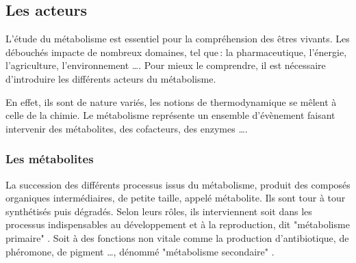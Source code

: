 \begin{refsection}
    \subsection{Les acteurs}
    
    L'étude du métabolisme est essentiel pour la compréhension des êtres vivants. Les débouchés impacte de nombreux domaines, tel que : la pharmaceutique, l'énergie, l'agriculture, l'environnement \ldots. Pour mieux le comprendre, il est nécessaire d'introduire les différents acteurs du métabolisme.
    
    En effet, ils sont de nature variés, les notions de thermodynamique se mêlent à celle de la chimie. Le métabolisme représente un ensemble d'évènement faisant intervenir des métabolites, des cofacteurs, des enzymes \ldots.
    
    
    \subsubsection{Les métabolites}
    
    La succession des différents processus issus du métabolisme, produit des composés organiques intermédiaires, de petite taille, appelé métabolite. Ils sont tour à tour synthétisés puis dégradés. Selon leurs rôles, ils interviennent soit dans les processus indispensables au développement et à la reproduction, dit "métabolisme primaire" . Soit à des fonctions non vitale comme la production d'antibiotique, de phéromone, de pigment \ldots, dénommé "métabolisme secondaire" .
    


\end{refsection}
